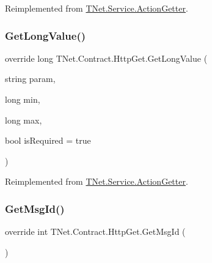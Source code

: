 Reimplemented from \mbox{\hyperlink{class_t_net_1_1_service_1_1_action_getter_ada14b85166336d05bcb01e384edb2d7f}{T\+Net.\+Service.\+Action\+Getter}}.

\mbox{\label{class_t_net_1_1_contract_1_1_http_get_a0dc96936421b99f52d03571a71c9e4e4}} 
\subsubsection{\texorpdfstring{Get\+Long\+Value()}{GetLongValue()}\hspace{0.1cm}{\footnotesize\ttfamily [2/2]}}
{\footnotesize\ttfamily override long T\+Net.\+Contract.\+Http\+Get.\+Get\+Long\+Value (\begin{DoxyParamCaption}\item[{string}]{param,  }\item[{long}]{min,  }\item[{long}]{max,  }\item[{bool}]{is\+Required = {\ttfamily true} }\end{DoxyParamCaption})\hspace{0.3cm}{\ttfamily [virtual]}}







Reimplemented from \mbox{\hyperlink{class_t_net_1_1_service_1_1_action_getter_acb9c5bcf560bbfa55f3db6bb6d47586e}{T\+Net.\+Service.\+Action\+Getter}}.

\mbox{\label{class_t_net_1_1_contract_1_1_http_get_a2e0ab50edf56ff86cb8d4c1ed1543f38}} 
\subsubsection{\texorpdfstring{Get\+Msg\+Id()}{GetMsgId()}}
{\footnotesize\ttfamily override int T\+Net.\+Contract.\+Http\+Get.\+Get\+Msg\+Id (\begin{DoxyParamCaption}{ }\end{DoxyParamCaption})\hspace{0.3cm}{\ttfamily [virtual]}}





